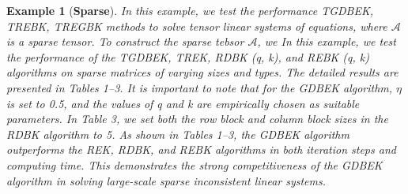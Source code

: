 \documentclass[11pt]{article}
\newtheorem{example}[theorem]{Example}
\def\fm#1{\mathcal{#1}}
\begin{document}
\begin{example}[\textbf{Sparse}] In this example, we test the performance TGDBEK, TREBK, TREGBK methods to solve tensor linear systems  of equations, where $\fm A$ is a sparse tensor. To construct the sparse tebsor $\fm A$, we
In this example, we test the performance of the TGDBEK, TREK, RDBK (q, k), and REBK (q, k)
algorithms on sparse matrices of varying sizes and types. The detailed results are presented in Tables 1–3. It is important to note that for the GDBEK algorithm, $\eta$ is set to 0.5, and the values of q and k are empirically
chosen as suitable parameters. In Table 3, we set both the row block and column block sizes in the RDBK
algorithm to 5. As shown in Tables 1–3, the GDBEK algorithm outperforms the REK, RDBK, and REBK
algorithms in both iteration steps and computing time. This demonstrates the strong competitiveness of
the GDBEK algorithm in solving large-scale sparse inconsistent linear systems.
\end{example}
\end{document}
